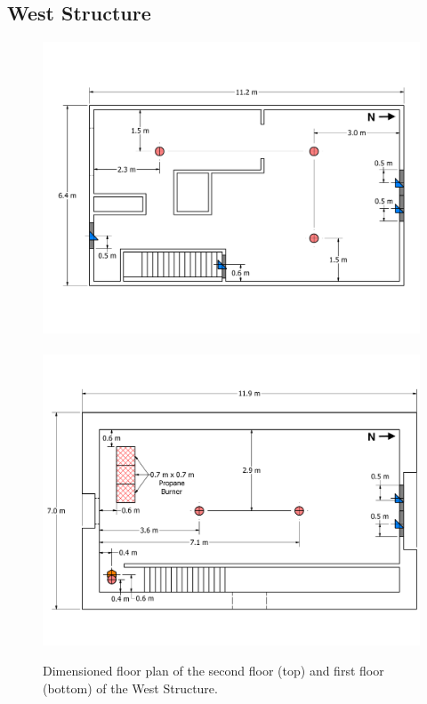\documentclass[12pt,oneside]{book}
\begin{document}
\subsection{West Structure}
\label{sec:West_instruments}

\begin{figure}[!ht]
	\includegraphics[width=\columnwidth]{../Figures/Floor_Plans/West_Structure_2nd_Floor_Dimensioned_Instrumentation}
	\\~\\
	\includegraphics[width=\columnwidth]{../Figures/Floor_Plans/West_Structure_1st_Floor_Dimensioned_Instrumentation}
	\caption[Dimensioned floor plan of the first and second floors of the West Structure.]{Dimensioned floor plan of the second floor (top) and first floor (bottom) of the West Structure.}
	\label{fig:west_instrumentation}
\end{figure}
\end{document}
